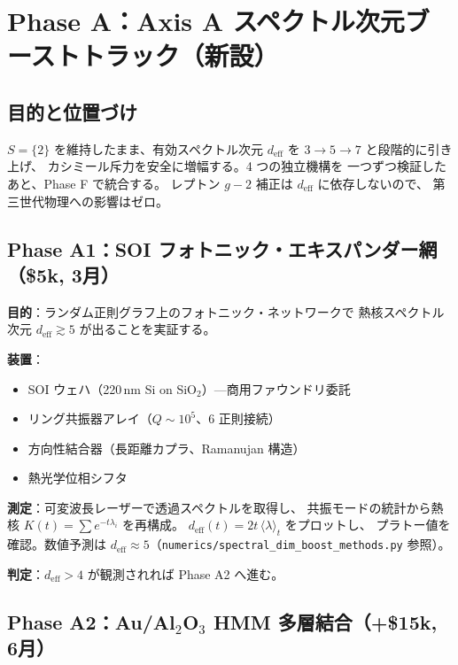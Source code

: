 \documentclass[11pt,a4paper]{article}
\begin{document}
\section{Phase A：Axis A スペクトル次元ブーストトラック（新設）}
\label{sec:phase_A}

\subsection{目的と位置づけ}

$S=\{2\}$ を維持したまま、有効スペクトル次元
$d_{\mathrm{eff}}$ を $3 \to 5 \to 7$ と段階的に引き上げ、
カシミール斥力を安全に増幅する。4 つの独立機構を
一つずつ検証したあと、Phase F で統合する。
レプトン $g-2$ 補正は $d_{\mathrm{eff}}$ に依存しないので、
第三世代物理への影響はゼロ。

\subsection{Phase A1：SOI フォトニック・エキスパンダー網（\$5k, 3月）}

\textbf{目的}：ランダム正則グラフ上のフォトニック・ネットワークで
熱核スペクトル次元 $d_{\mathrm{eff}} \gtrsim 5$ が出ることを実証する。

\textbf{装置}：
\begin{itemize}
\item SOI ウェハ（220\,nm Si on SiO$_2$）—商用ファウンドリ委託
\item リング共振器アレイ（$Q \sim 10^5$、6 正則接続）
\item 方向性結合器（長距離カプラ、Ramanujan 構造）
\item 熱光学位相シフタ
\end{itemize}

\textbf{測定}：可変波長レーザーで透過スペクトルを取得し、
共振モードの統計から熱核 $K(t) = \sum e^{-t\lambda_i}$ を再構成。
$d_{\mathrm{eff}}(t) = 2t\,\langle\lambda\rangle_t$ をプロットし、
プラトー値を確認。数値予測は
$d_{\mathrm{eff}} \approx 5$（\texttt{numerics/spectral\_dim\_boost\_methods.py} 参照）。

\textbf{判定}：$d_{\mathrm{eff}} > 4$ が観測されれば Phase A2 へ進む。

\subsection{Phase A2：Au/Al$_2$O$_3$ HMM 多層結合（+\$15k, 6月）}
\end{document}
